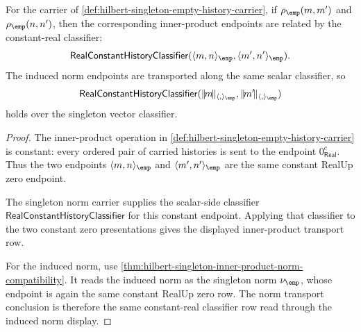 \begin{theorem}
\label{thm:hilbert-singleton-constant-inner-product-transport}
For the carrier of
\autoref{def:hilbert-singleton-empty-history-carrier}, if
$\rho_{\emp}(m,m')$ and $\rho_{\emp}(n,n')$, then the corresponding
inner-product endpoints are related by the constant-real classifier:
$$
\mathsf{RealConstantHistoryClassifier}
  (\langle m,n\rangle_{\emp},\langle m',n'\rangle_{\emp}).
$$
The induced norm endpoints are transported along the same scalar classifier,
so
$$
\mathsf{RealConstantHistoryClassifier}
  (\|\!m\!\|_{\langle,\rangle_{\emp}},\|\!m'\!\|_{\langle,\rangle_{\emp}})
$$
holds over the singleton vector classifier.
\end{theorem}
\begin{proof}
The inner-product operation in
\autoref{def:hilbert-singleton-empty-history-carrier} is constant: every
ordered pair of carried histories is sent to the endpoint
$0_{\mathsf{Real}}^{c}$. Thus the two endpoints
$\langle m,n\rangle_{\emp}$ and $\langle m',n'\rangle_{\emp}$ are the same
constant RealUp zero endpoint.

The singleton norm carrier supplies the scalar-side classifier
$\mathsf{RealConstantHistoryClassifier}$ for this constant endpoint. Applying
that classifier to the two constant zero presentations gives the displayed
inner-product transport row.

For the induced norm, use
\autoref{thm:hilbert-singleton-inner-product-norm-compatibility}. It reads
the induced norm as the singleton norm $\nu_{\emp}$, whose endpoint is again
the same constant RealUp zero row. The norm transport conclusion is therefore
the same constant-real classifier row read through the induced norm display.
\end{proof}

